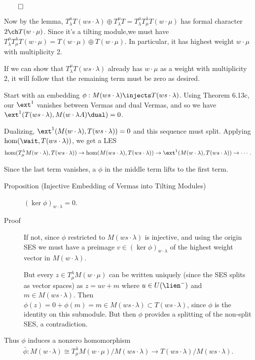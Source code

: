 \(\qed\)

Now by the lemma,
\(T_\lambda^\mu T(ws \cdot \lambda) \oplus T_\lambda^\mu T = T_\lambda^\mu T_\mu^\lambda T(w\cdot \mu)\)
has formal character \(2 \ch T(w\cdot \mu)\). Since it's a tilting
module,we must have
\(T_\lambda^\mu T_\mu^\lambda T(w\cdot \mu) = T(w\cdot \mu) \oplus T(w\cdot \mu)\).
In particular, it has highest weight \(w\cdot \mu\) with multiplicity 2.

If we can show that \(T_\lambda^\mu T(ws\cdot \lambda)\) already has
\(w\cdot \mu\) as a weight with multiplicity 2, it will follow that the
remaining term must be zero as desired.

Start with an embedding
\(\phi: M(ws\cdot \lambda) \injects T(ws\cdot \lambda)\). Using Theorem
6.13c, our \(\ext^1\) vanishes between Vermas and dual Vermas, and so we
have \(\ext^1 (T(ws\cdot \lambda), M(w\cdot\lambda A)\dual) = 0\).

Dualizing, \(\ext^1(M(w\cdot \lambda), T(ws\cdot \lambda)) = 0\) and
this sequence must split. Applying \(\hom(\wait, T(ws\cdot \lambda))\),
we get a LES \begin{align*}
\hom(T_\mu^\lambda M(w\cdot \lambda), T(ws\cdot \lambda)) \to \hom(M(ws\cdot \lambda), T(ws\cdot \lambda)) \to \ext^1(M(w\cdot \lambda), T(ws\cdot\lambda)) \to \cdots
.\end{align*}

Since the last term vanishes, a \(\phi\) in the middle term lifts to the
first term.

\begin{description}
\item[Proposition (Injective Embedding of Vermas into Tilting Modules)]
\((\ker\phi)_{w\cdot \lambda} = 0\).
\item[Proof]
If not, since \(\phi\) restricted to \(M(ws\cdot \lambda)\) is
injective, and using the origin SES we must have a preimage
\(v\in (\ker \phi)_{w\cdot \lambda}\) of the highest weight vector in
\(M(w\cdot \lambda)\).

But every \(z\in T_\mu^\lambda M(w\cdot \mu)\) can be written uniquely
(since the SES splits as vector spaces) as \(z = uv + m\) where
\(u\in U(\lien^-)\) and \(m\in M(ws\cdot \lambda)\). Then
\(\phi(z) = 0 + \phi(m) = m \in M(ws\cdot \lambda) \subset T(ws\cdot\lambda)\),
since \(\phi\) is the identity on this submodule. But then \(\phi\)
provides a splitting of the non-split SES, a contradiction.
\end{description}

Thus \(\phi\) induces a nonzero homomorphism \begin{align*}
\bar \phi : M(w\cdot \lambda) \cong T_\mu^\lambda M(w\cdot \mu) / M(ws\cdot \lambda) \to T(ws\cdot \lambda) / M(ws\cdot \lambda)
.\end{align*}

